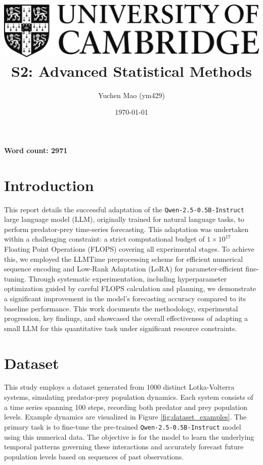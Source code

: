 \documentclass{article}
\title{
    \includegraphics[scale=0.2]{Images/cam_logo_bw.png}\\ %
    \vspace{0.5cm}
    S2: Advanced Statistical Methods
}
\author{Yuchen Mao (ym429)}
\affil{Department of Physics, University of Cambridge}
\date{\today}
\begin{document}
\maketitle
\noindent\textbf{Word count: 2971}

\tableofcontents
\newpage


\section{Introduction}
\label{sec:introduction}
This report details the successful adaptation of the \texttt{Qwen-2.5-0.5B-Instruct} large language model (LLM), originally trained for natural language tasks, to perform predator-prey time-series forecasting. This adaptation was undertaken within a challenging constraint: a strict computational budget of $1 \times 10^{17}$ Floating Point Operations (FLOPS) covering all experimental stages. To achieve this, we employed the LLMTime preprocessing scheme \cite{gruver2024largelanguagemodelszeroshot} for efficient numerical sequence encoding and Low-Rank Adaptation (LoRA) \cite{hu2021loralowrankadaptationlarge} for parameter-efficient fine-tuning. Through systematic experimentation, including hyperparameter optimization guided by careful FLOPS calculation and planning, we demonstrate a significant improvement in the model's forecasting accuracy compared to its baseline performance. This work documents the methodology, experimental progression, key findings, and showcased the overall effectiveness of adapting a small LLM for this quantitative task under significant resource constraints.



\section{Dataset}
\label{sec:dataset}

This study employs a dataset generated from 1000 distinct Lotka-Volterra systems, simulating predator-prey population dynamics. Each system consists of a time series spanning 100 steps, recording both predator and prey population levels. Example dynamics are visualized in Figure \ref{fig:dataset_examples}. The primary task is to fine-tune the pre-trained \texttt{Qwen-2.5-0.5B-Instruct} model using this numerical data. The objective is for the model to learn the underlying temporal patterns governing these interactions and accurately forecast future population levels based on sequences of past observations.
\end{document}
